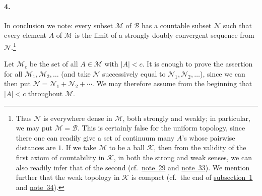\documentclass[
  paper=b5,
  twoside=true,
  fontsize=13pt,
  headings=normal,
  bookmarkpackage=false
]{scrartcl}
\theoremstyle{definition}
\newcommand{\NoteRef}[1]{\hyperref[fn:#1]{note~#1}}
\begin{document}
\paragraph*{4.}\label{sec:topologies-4}
In conclusion we note: every subset \(\mathcal M\) of \(\mathcal B\)
has a countable subset \(\mathcal N\) such that every element \(A\) of
\(\mathcal M\) is the limit of a strongly doubly convergent sequence
from \(\mathcal N\).\footnote{\label{fn:38}Thus \(\mathcal N\) is
everywhere dense in \(\mathcal M\), both strongly and weakly; in
particular, we may put \(\mathcal M=\mathcal B\).  This is certainly
false for the uniform topology, since there one can readily give a set
of continuum many \(A\)'s whose pairwise distances are \(1\).  If we
take \(\mathcal M\) to be a ball \(\mathcal K\), then from the validity
of the first axiom of countability in \(\mathcal K\), in both the strong
and weak senses, we can also readily infer that of the second
(cf.\ \NoteRef{29} and \NoteRef{33}).  We mention further that the weak
topology in \(\mathcal K\) is compact
(cf.\ the end of \hyperref[sec:topologies-1]{subsection~1} and
\NoteRef{34}).}

Let \(\mathcal M_c\) be the set of all \(A\in\mathcal M\) with
\(\lvert A\rvert<c\).  It is enough to prove the assertion for all
\(\mathcal M_1,\mathcal M_2,\ldots\) (and take
\(\mathcal N\) successively equal to
\(\mathcal N_1,\mathcal N_2,\ldots\)), since we can then put
\(\mathcal N=\mathcal N_1+\mathcal N_2+\cdots\).  We may therefore
assume from the beginning that \(\lvert A\rvert<c\) throughout
\(\mathcal M\).
\end{document}
